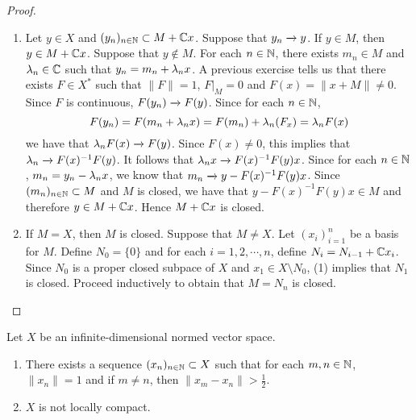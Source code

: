 \documentclass{book}
\begin{document}
	\begin{proof}
		\begin{enumerate}
			\item Let $y \in X$ and $(y_n)_{n \in \mathbb{N}} \subset M+ \mathbb{C} x$. Suppose that $y_n \xrightarrow{} y$. If $y \in M$, then $y \in M+ \mathbb{C} x$. Suppose that $y \not \in M$. For each $n \in \mathbb{N}$, there exists $m_n \in M$ and $\lambda_n \in \mathbb{C}$ such that $y_n = m_n + \lambda_nx$. A previous exercise tells us that there exists $F \in X^*$ such that $\|F \|= 1$, $F|_M = 0$ and $F(x) = \|x+M \|\neq 0$. Since $F$ is continuous, $F(y_n) \xrightarrow{} F(y)$. Since for each $n \in \mathbb{N}$, $$F(y_n) = F(m_n + \lambda_n x) = F(m_n)+ \lambda_n (F_x) = \lambda_n F(x)$$ we have that $\lambda_n F(x) \xrightarrow{} F(y)$. Since $F(x) \neq 0$, this implies that $\lambda_n \xrightarrow{} F(x)^{-1} F(y)$. It follows that $\lambda_n x \xrightarrow{}F(x)^{-1}F(y)x$. Since  for each $n \in \mathbb{N}$, $m_n = y_n - \lambda_nx$, we know that $m_n \xrightarrow{} y-F(x)^{-1}F(y)x$. Since $(m_n)_{n \in \mathbb{N}} \subset M$ and $M$ is closed, we have that $y-F(x)^{-1}F(y)x \in M$ and therefore $y \in M+\mathbb{C} x$. Hence $M+\mathbb{C} x$ is closed. \vspace{.5cm}\\
			\item If $M = X$, then $M$ is closed. Suppose that $M \neq X$. Let $(x_i)_{i=1}^n$ be a basis for $M$. Define $N_0 = \{0\}$ and for each $i =1,2, \cdots, n$, define $N_i = N_{i-1}+\mathbb{C} x_i$. Since $N_0$ is a proper closed subpace of $X$ and $x_1 \in X \setminus N_0$, (1) implies that $N_1$ is closed. Proceed inductively to obtain that $M = N_n$ is closed.
		\end{enumerate}
	\end{proof}
	
	\begin{ex} 
		Let $X$ be an infinite-dimensional normed vector space. 
		\begin{enumerate}
			\item There exists a sequence $(x_n)_{n\in \mathbb{N}} \subset X$ such that for each $m, n \in \mathbb{N}$, $\|x_n \|= 1$ and if $m \neq n$, then $\|x_m - x_n \|> \frac{1}{2}$.
			\item $X$ is not locally compact. 
		\end{enumerate}
	\end{ex}
	
\end{document}
